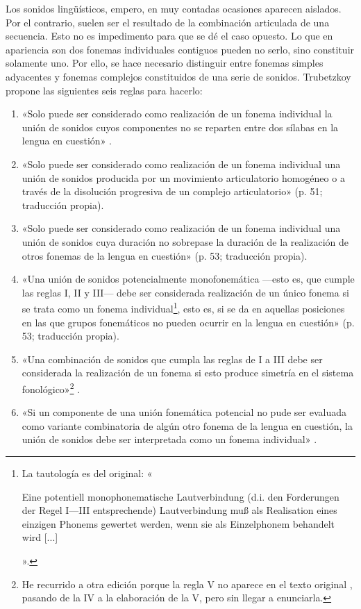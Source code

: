 Los sonidos lingüísticos, empero, en muy contadas ocasiones aparecen aislados. Por el contrario, suelen ser el resultado de la combinación articulada de una secuencia. Esto no es impedimento para que se dé el caso opuesto. Lo que en apariencia son dos fonemas individuales contiguos pueden no serlo, sino constituir solamente uno. Por ello, se hace necesario distinguir entre fonemas simples adyacentes y fonemas complejos constituidos de una serie de sonidos. Trubetzkoy propone las siguientes seis reglas para hacerlo:
\begin{enumerate}[label=\Roman*]
	\item «Solo puede ser considerado como realización de un fonema individual la unión de sonidos cuyos componentes no se reparten entre dos sílabas en la lengua en cuestión» \parencite[p. 50; traducción propia]{trubetzkoy1939}.
	\item «Solo puede ser considerado como realización de un fonema individual una unión de sonidos producida por un movimiento articulatorio homogéneo o a través de la disolución progresiva de un complejo articulatorio»  (p. 51; traducción propia).
	\item «Solo puede ser considerado como realización de un fonema individual una unión de sonidos cuya duración no sobrepase la duración de la realización de otros fonemas de la lengua en cuestión» (p. 53; traducción propia).
	\item «Una unión de sonidos potencialmente monofonemática —esto es, que cumple las reglas I, II y III— debe ser considerada realización de un único fonema si se trata como un fonema individual\footnote{La tautología es del original: «\begin{textgerman}Eine potentiell monophonematische Lautverbindung (d.i. den Forderungen der Regel I—III entsprechende) Lautverbindung muß als Realisation eines einzigen Phonems gewertet werden, wenn sie als Einzelphonem behandelt wird [...]\end{textgerman}».}, esto es, si se da en aquellas posiciones en las que grupos fonemáticos no pueden ocurrir en la lengua en cuestión» (p. 53; traducción propia).
		\item «Una combinación de sonidos que cumpla las reglas de I a III debe ser considerada la realización de un fonema si esto produce simetría en el sistema fonológico»\footnote{He recurrido a otra edición \parencite{trubetzkoy1969} porque la regla V no aparece en el texto original \parencite{trubetzkoy1939}, pasando de la IV a la elaboración de la V, pero sin llegar a enunciarla.} \parencite[p. 59; traducción propia]{trubetzkoy1969}.
	\item «Si un componente de una unión fonemática potencial no pude ser evaluada como variante combinatoria de algún otro fonema de la lengua en cuestión, la unión de sonidos debe ser interpretada como un fonema individual» \parencite[p. 56; traducción propia]{trubetzkoy1939}. 
\end{enumerate}

